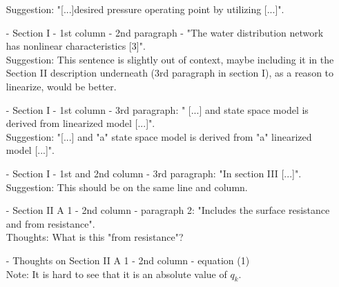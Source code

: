 \begin{itemize}
Suggestion: "[...]desired pressure operating point by utilizing [...]".\\
\item[-]Section I - 1st column - 2nd paragraph - "The water distribution network has nonlinear characteristics [3]".\\
Suggestion: This sentence is slightly out of context, maybe including it in the Section II description underneath (3rd paragraph in section I), as a reason to linearize, would be better.\\
\item[-]Section I - 1st column - 3rd paragraph: " [...] and state space model is derived from linearized model [...]".\\
Suggestion: "[...] and "a" state space model is derived from "a" linearized model [...]".\\
\item[-]Section I - 1st and 2nd column - 3rd paragraph: "In section III [...]".\\
Suggestion: This should be on the same line and column.\\
\item[-]Section II A 1 - 2nd column - paragraph 2: "Includes the surface resistance and from resistance".\\
Thoughts: What is this "from resistance"?\\
\item[-]Thoughts on Section II A 1 - 2nd column - equation (1)\\
Note: It is hard to see that it is an absolute value of $q_k$. \\


\end{itemize}
